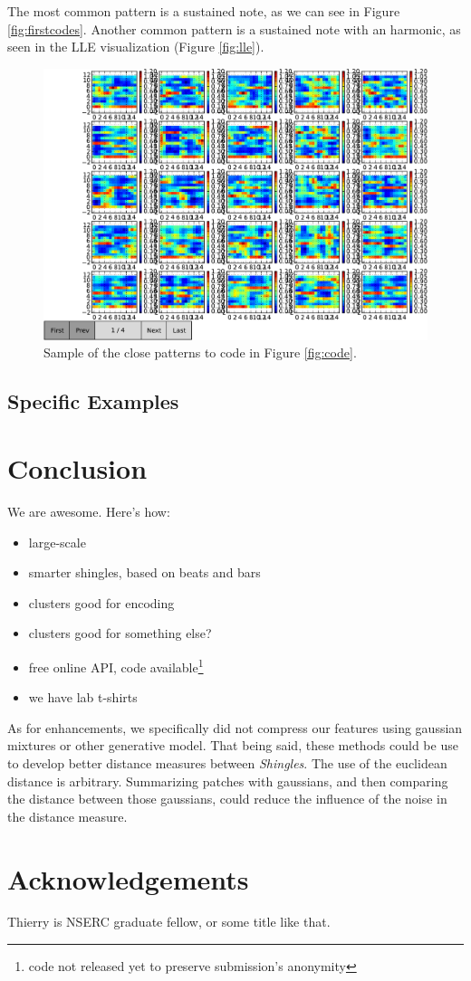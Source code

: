 \documentclass{article}
\begin{document}
The most common pattern is a sustained note, as we can see in Figure
\ref{fig:firstcodes}. Another common pattern is a sustained note
with an harmonic, as seen in the LLE visualization (Figure \ref{fig:lle}).

\begin{figure}[htb]
\begin{center}
\includegraphics[width=.9\columnwidth]{close_patterns1}
\end{center}
\caption{{Sample of the close patterns to code in Figure \ref{fig:code}.}}
\label{fig:closep}
\end{figure}

\subsection{Specific Examples}


\section{Conclusion}
We are awesome. Here's how:
\begin{itemize}
\item large-scale
\item smarter shingles, based on beats and bars
\item clusters good for encoding
\item clusters good for something else?
\item free online API, code available\footnote{code not released yet to preserve 
submission's anonymity}
\item we have lab t-shirts
\end{itemize}

As for enhancements, we specifically did not compress our features using
gaussian mixtures or other generative model. That being said, these methods
could be use to develop better distance measures between \textit{Shingles}.
The use of the euclidean distance is arbitrary. Summarizing patches
with gaussians, and then comparing the distance between those gaussians,
could reduce the influence of the noise in the distance measure.



\small
\section{Acknowledgements}
Thierry is NSERC graduate fellow, or some title like that.




\end{document}
